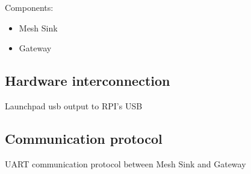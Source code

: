 \documentclass[12pt]{article}
\begin{document}
Components:
\begin{itemize}
\item{Mesh Sink}
\item{Gateway}
\end{itemize}

\subsection{Hardware interconnection}


Launchpad usb output to RPI's USB


\subsection{Communication protocol}


UART communication protocol between Mesh Sink and Gateway







%
%
\end{document}
